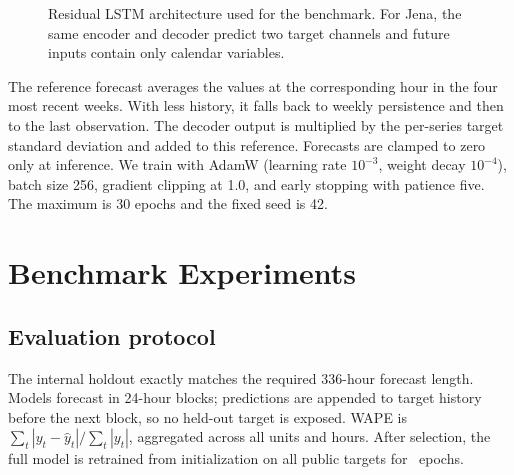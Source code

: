 \documentclass[10pt,a4paper]{article}
\begin{document}
\begin{figure}[t]
\centering
{}
\caption{Residual LSTM architecture used for the benchmark. For Jena, the same
encoder and decoder predict two target channels and future inputs contain only
calendar variables.}
\label{fig:architecture}
\end{figure}

The reference forecast averages the values at the corresponding hour in the
four most recent weeks. With less history, it falls back to weekly persistence
and then to the last observation. The decoder output is multiplied by the
per-series target standard deviation and added to this reference. Forecasts are
clamped to zero only at inference. We train with AdamW (learning rate $10^{-3}$,
weight decay $10^{-4}$), batch size 256, gradient clipping at 1.0, and early
stopping with patience five. The maximum is 30 epochs and the fixed seed is 42.

\section{Benchmark Experiments}
\subsection{Evaluation protocol}
The internal holdout exactly matches the required 336-hour forecast length.
Models forecast in 24-hour blocks; predictions are appended to target history
before the next block, so no held-out target is exposed. WAPE is
$\sum_t |y_t-\hat y_t| / \sum_t |y_t|$, aggregated across all units and hours.
After selection, the full model is retrained from initialization on all public
targets for \SelectedEpoch\ epochs.
\end{document}
